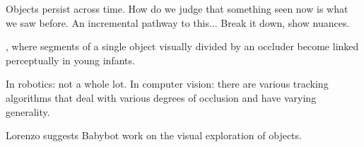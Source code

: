 
Objects persist across time.  How do we judge that something seen
now is what we saw before.  An incremental pathway to this...
Break it down, show nuances.


\cite{johnson02development}, where segments of a single object
visually divided by an occluder become linked perceptually in
young infants.


In robotics: not a whole lot.
In computer vision: there are various tracking algorithms
that deal with various degrees of occlusion and have varying
generality.

Lorenzo suggests Babybot work on the visual exploration of objects.
